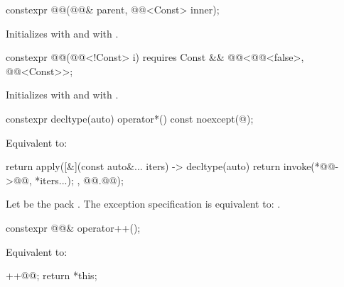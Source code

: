 \begin{itemdecl}
constexpr @@(@@& parent, @@<Const> inner);
\end{itemdecl}

\begin{itemdescr}
\pnum
\effects
Initializes  with  and
 with .
\end{itemdescr}

\begin{itemdecl}
constexpr @@(@@<!Const> i)
  requires Const && @@<@@<false>, @@<Const>>;
\end{itemdecl}

\begin{itemdescr}
\pnum
\effects
Initializes  with  and
 with .
\end{itemdescr}

\begin{itemdecl}
constexpr decltype(auto) operator*() const noexcept(@\seebelow@);
\end{itemdecl}

\begin{itemdescr}
\pnum
\effects
Equivalent to:
\begin{codeblock}
return apply([&](const auto&... iters) -> decltype(auto) {
  return invoke(*@@->@@, *iters...);
}, @@.@@);
\end{codeblock}

\pnum
\remarks
Let  be the pack .
The exception specification is equivalent to:
.
\end{itemdescr}

\begin{itemdecl}
constexpr @@& operator++();
\end{itemdecl}

\begin{itemdescr}
\pnum
\effects
Equivalent to:
\begin{codeblock}
++@@;
return *this;
\end{codeblock}
\end{itemdescr}

